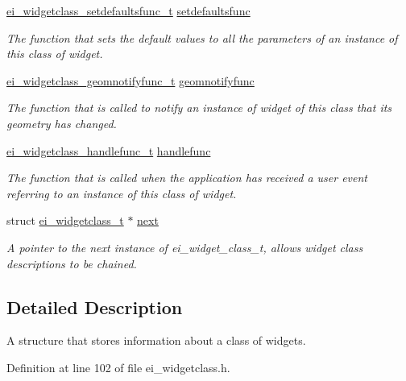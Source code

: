 \begin{DoxyCompactItemize}
\hyperlink{ei__widgetclass_8h_aa04d729c9dca14d3ac92c0f9aa8cc5cb}{ei\-\_\-widgetclass\-\_\-setdefaultsfunc\-\_\-t} \hyperlink{structei__widgetclass__t_a5fec706eefca10172d897cf61b268510}{setdefaultsfunc}
\begin{DoxyCompactList}\small\item\em The function that sets the default values to all the parameters of an instance of this class of widget. \end{DoxyCompactList}\item 
\hyperlink{ei__widgetclass_8h_a751dc2e4c264c3597fcc2d59878f6265}{ei\-\_\-widgetclass\-\_\-geomnotifyfunc\-\_\-t} \hyperlink{structei__widgetclass__t_aaf0aa3f54a48a6b3f8b8e12574ede4b7}{geomnotifyfunc}
\begin{DoxyCompactList}\small\item\em The function that is called to notify an instance of widget of this class that its geometry has changed. \end{DoxyCompactList}\item 
\hyperlink{ei__widgetclass_8h_a003bfd0e21f41f04058ee0065bbf43d7}{ei\-\_\-widgetclass\-\_\-handlefunc\-\_\-t} \hyperlink{structei__widgetclass__t_a5ed633370e3c90d21244d93d5467227e}{handlefunc}
\begin{DoxyCompactList}\small\item\em The function that is called when the application has received a user event referring to an instance of this class of widget. \end{DoxyCompactList}\item 
struct \hyperlink{structei__widgetclass__t}{ei\-\_\-widgetclass\-\_\-t} $\ast$ \hyperlink{structei__widgetclass__t_aa184e650475ec2451f033858db1876f0}{next}
\begin{DoxyCompactList}\small\item\em A pointer to the next instance of ei\-\_\-widget\-\_\-class\-\_\-t, allows widget class descriptions to be chained. \end{DoxyCompactList}\end{DoxyCompactItemize}


\subsection{Detailed Description}
A structure that stores information about a class of widgets. 

Definition at line 102 of file ei\-\_\-widgetclass.\-h.



